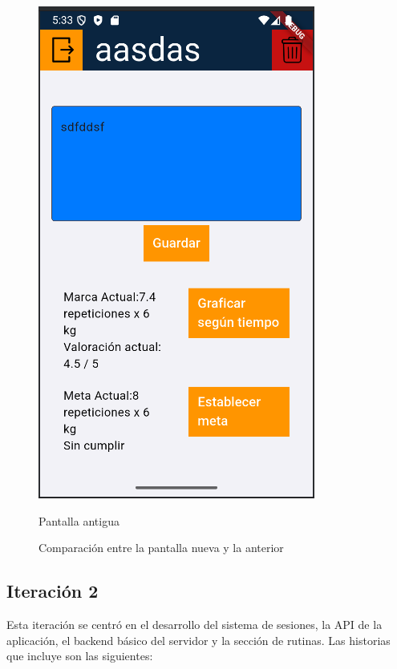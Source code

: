 \begin{figure}[h!]
\begin{minipage}[b]{0.45\textwidth}
    \includegraphics[width=\textwidth]{fotos/ejerciciosVieja.png}
    \caption{Pantalla antigua}
    \label{fig:pantalla_vieja}
  \end{minipage}
  \caption{Comparación entre la pantalla nueva y la anterior}
  \label{fig:comparacion_pantallas}
\end{figure}

\subsection{Iteración 2}
Esta iteración se centró en el desarrollo del sistema de sesiones, la API de la aplicación, el backend básico del servidor y la sección de rutinas. Las historias que incluye son las siguientes:

